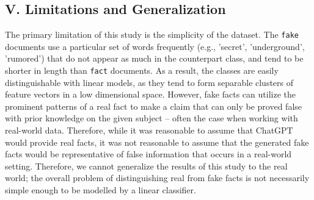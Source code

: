 \documentclass[11pt]{article}
\begin{document}
\subsection*{V. Limitations and Generalization}
The primary limitation of this study is the simplicity of the dataset.
The \texttt{fake} documents use a particular set of words 
frequently (e.g., 'secret', 'underground', 'rumored')
that do not appear as much in the counterpart class, and
tend to be shorter in length than \texttt{fact} documents.
As a result, the classes are easily distinguishable with linear models,
as they tend to form separable clusters of feature vectors in a low dimensional space. However,
fake facts can utilize the prominent patterns
of a real fact to make a claim that can only be proved 
false with prior knowledge on the given subject – often the case when working with real-world data.
Therefore, while it was reasonable to assume that ChatGPT would provide real facts,
it was not reasonable to assume that the generated 
fake facts would be representative of false
information that occurs in a real-world setting. 
Therefore, we cannot generalize the results of this
study to the real world; 
the overall problem of distinguishing real from fake
facts is not necessarily simple enough to be modelled by
a linear classifier.
\end{document}
